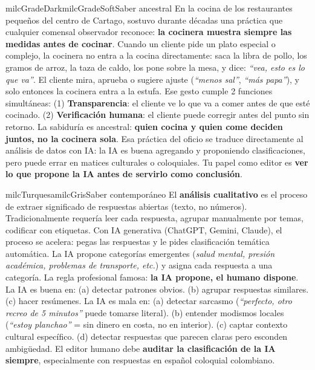 \documentclass[11pt,letterpaper]{article}
\begin{document}
\begin{softbox}{milcGradeDark}{milcGradeSoft}{Saber ancestral}
En la cocina de los restaurantes pequeños del centro de Cartago, sostuvo durante décadas una práctica que cualquier comensal observador reconoce: \textbf{la cocinera muestra siempre las medidas antes de cocinar}. Cuando un cliente pide un plato especial o complejo, la cocinera no entra a la cocina directamente: saca la libra de pollo, los gramos de arroz, la taza de caldo, los pone sobre la mesa, y dice: \emph{``vea, esto es lo que va''}. El cliente mira, aprueba o sugiere ajuste (\emph{``menos sal''}, \emph{``más papa''}), y solo entonces la cocinera entra a la estufa. Ese gesto cumple 2 funciones simultáneas: (1) \textbf{Transparencia}: el cliente ve lo que va a comer antes de que esté cocinado. (2) \textbf{Verificación humana}: el cliente puede corregir antes del punto sin retorno. La sabiduría es ancestral: \textbf{quien cocina y quien come deciden juntos, no la cocinera sola}. Esa práctica del oficio se traduce directamente al análisis de datos con IA: la IA es buena agregando y proponiendo clasificaciones, pero puede errar en matices culturales o coloquiales. Tu papel como editor es \textbf{ver lo que propone la IA antes de servirlo como conclusión}.
\end{softbox}

\begin{softbox}{milcTurquesa}{milcGris}{Saber contemporáneo}
El \textbf{análisis cualitativo} es el proceso de extraer significado de respuestas abiertas (texto, no números). Tradicionalmente requería leer cada respuesta, agrupar manualmente por temas, codificar con etiquetas. Con IA generativa (ChatGPT, Gemini, Claude), el proceso se acelera: pegas las respuestas y le pides clasificación temática automática. La IA propone categorías emergentes (\emph{salud mental, presión académica, problemas de transporte, etc.}) y asigna cada respuesta a una categoría. La regla profesional famosa: \textbf{la IA propone, el humano dispone}. La IA es buena en: (a) detectar patrones obvios. (b) agrupar respuestas similares. (c) hacer resúmenes. La IA es mala en: (a) detectar sarcasmo (\emph{``perfecto, otro recreo de 5 minutos''} puede tomarse literal). (b) entender modismos locales (\emph{``estoy planchao''} = sin dinero en costa, no en interior). (c) captar contexto cultural específico. (d) detectar respuestas que parecen claras pero esconden ambigüedad. El editor humano debe \textbf{auditar la clasificación de la IA siempre}, especialmente con respuestas en español coloquial colombiano.
\end{softbox}
\end{document}
